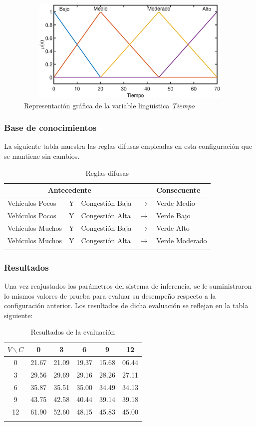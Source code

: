 \begin{figure}[H]
	\centering
	\includegraphics[height=5cm, width=12cm]{Variables/ConfigB_output1.eps}
	\caption[Representación gráfica de la variable lingüística \textit{Tiempo} (configuración \textit{B})]{Representación gráfica de la variable lingüística \textit{Tiempo}}
\end{figure}

\subsubsection{Base de conocimientos}
La siguiente tabla muestra las reglas difusas empleadas en esta configuración que se mantiene sin cambios.
\begin{longtable}[c]{lclcl} \toprule
	\multicolumn{3}{c}{Antecedente} & & Consecuente \\ \midrule
	Vehículos Pocos & Y & Congestión Baja& $\rightarrow$ & Verde Medio \\
	Vehículos Pocos & Y & Congestión Alta& $\rightarrow$ & Verde Bajo \\
	Vehículos Muchos &Y& Congestión Baja& $\rightarrow$ & Verde Alto \\
	Vehículos Muchos &Y& Congestión Alta& $\rightarrow$ & Verde Moderado \\ \hline
	\caption[Reglas difusas (configuración \textit{B})]{Reglas difusas}
\end{longtable}

\pagebreak
\subsubsection{Resultados}
Una vez reajustados los parámetros del sistema de inferencia, se le suministraron lo mismos valores de prueba para evaluar su desempeño respecto a la configuración anterior. Los resultados de dicha evaluación se reflejan en la tabla siguiente:

\begin{longtable}[c]{cccccc} \toprule
	$V \backslash C$ &  0 & 3 & 6 & 9 & 12 \\ \midrule
	0 & 21.67 & 21.09 & 19.37 & 15.68 & 06.44 \\
	3 & 29.56 & 29.69 & 29.16 & 28.26 & 27.11 \\
	6 & 35.87 & 35.51 & 35.00 & 34.49 & 34.13 \\
	9 & 43.75 & 42.58 & 40.44 & 39.14 & 39.18 \\
	12& 61.90 & 52.60 & 48.15 & 45.83 & 45.00 \\
	\caption[Resultados de la evaluación (configuración \textit{B})]{Resultados de la evaluación}
\end{longtable}

